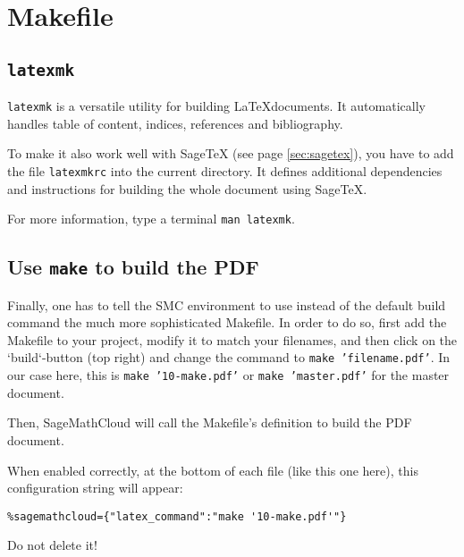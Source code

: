 \documentclass[master.tex]{subfiles}
\begin{document}
\chapter{Makefile}

\section{\texttt{latexmk}}

\texttt{latexmk} is a versatile utility for building \LaTeX documents.
It automatically handles table of content, indices,
references and bibliography.

To make it also work well with SageTeX (see page \ref{sec:sagetex}),
you have to add the file \texttt{latexmkrc}
into the current directory.
It defines additional dependencies and instructions for
building the whole document using SageTeX.

For more information, type a terminal \texttt{man latexmk}.

\section{Use \texttt{make} to build the PDF}

Finally, one has to tell the SMC environment to use
instead of the default build command
the much more sophisticated Makefile.
In order to do so,
first add the Makefile to your project,
modify it to match your filenames,
and then click on the `build`-button (top right)
and change the command to \texttt{make 'filename.pdf'}.
In our case here, this is \texttt{make '10-make.pdf'}
or \texttt{make 'master.pdf'} for the master document.

Then, SageMathCloud will call the Makefile's definition to build the PDF document.

When enabled correctly, at the bottom of each file (like this one here),
this configuration string will appear:

\begin{verbatim}
%sagemathcloud={"latex_command":"make '10-make.pdf'"}
\end{verbatim}

Do not delete it!
\end{document}
